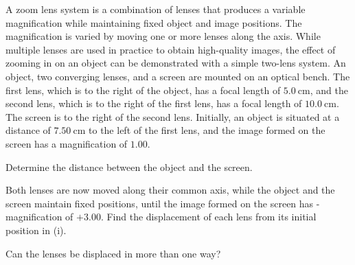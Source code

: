 \begin{problem}
    A zoom lens system is a combination of lenses that produces a variable magnification while maintaining fixed object and image positions. The magnification is varied by moving one or more lenses along the axis. While multiple lenses are used in practice to obtain high-quality images, the effect of zooming in on an object can be demonstrated with a simple two-lens system. An object, two converging lenses, and a screen are mounted on an optical bench. The first lens, which is to the right of the object, has a focal length of $\qty{5.0}{\cm}$, and the second lens, which is to the right of the first lens, has a focal length of $\qty{10.0}{\cm}$. The screen is to the right of the second lens. Initially, an object is situated at a distance of $\qty{7.50}{\cm}$ to the left of the first lens, and the image formed on the screen has a magnification of $1.00$.
    \begin{subproblem}
        Determine the distance between the object and the screen.
    \end{subproblem}

    \begin{subproblem}
        Both lenses are now moved along their common axis, while the object and the screen maintain fixed positions, until the image formed on the screen has - magnification of $+3.00$. Find the displacement of each lens from its initial position in (i).
    \end{subproblem}

    \begin{subproblem}
        Can the lenses be displaced in more than one way?
    \end{subproblem}
\end{problem}

